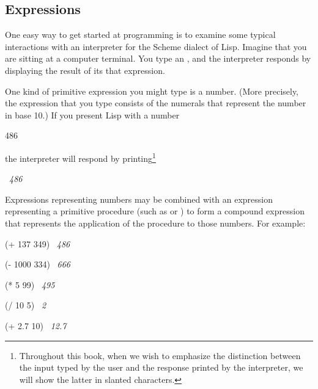\subsection{Expressions}
\label{Section 1.1.1}

One easy way to get started at programming is to examine some typical
interactions with an interpreter for the Scheme dialect of Lisp. Imagine that
you are sitting at a computer terminal. You type an , and
the interpreter responds by displaying the result of its 
that expression.

One kind of primitive expression you might type is a number. (More precisely,
the expression that you type consists of the numerals that represent the number
in base 10.) If you present Lisp with a number

\begin{codeBlock}
486
\end{codeBlock}

\noindent
the interpreter will respond by printing\footnote{Throughout this book, when
we wish to emphasize the distinction between the input typed by the user and
the response printed by the interpreter, we will show the latter in slanted
characters.}

\begin{codeBlock}
~\textit{486}~
\end{codeBlock}

\noindent
Expressions representing numbers may be combined with an expression
representing a primitive procedure (such as \code{+} or \code{*}) to form a
compound expression that represents the application of the procedure to those
numbers. For example:

\begin{codeBlock}
(+ 137 349)
~\textit{486}~
\end{codeBlock}

\begin{codeBlock}
(- 1000 334)
~\textit{666}~
\end{codeBlock}

\begin{codeBlock}
(* 5 99)
~\textit{495}~
\end{codeBlock}

\begin{codeBlock}
(/ 10 5)
~\textit{2}~
\end{codeBlock}

\begin{codeBlock}
(+ 2.7 10)
~\textit{12.7}~
\end{codeBlock}

